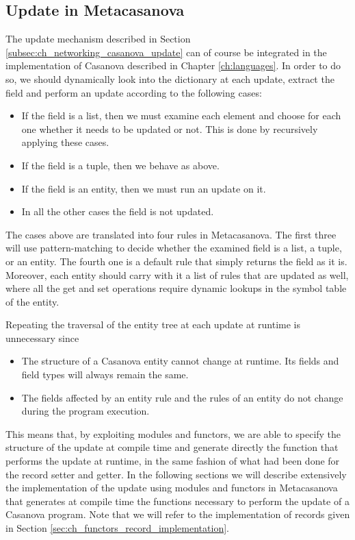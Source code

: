 \subsection{Update in Metacasanova}
\label{subsec:ch_networking_update_metacasanova}
The update mechanism described in Section \ref{subsec:ch_networking_casanova_update} can of course be integrated in the implementation of Casanova described in Chapter \ref{ch:languages}. In order to do so, we should dynamically look into the dictionary at each update, extract the field and perform an update according to the following cases:

\begin{itemize}[noitemsep]
	\item If the field is a list, then we must examine each element and choose for each one whether it needs to be updated or not. This is done by recursively applying these cases.
	\item If the field is a tuple, then we behave as above.
	\item If the field is an entity, then we must run an update on it.
	\item In all the other cases the field is not updated.
\end{itemize}

\noindent
The cases above are translated into four rules in Metacasanova. The first three will use pattern-matching to decide whether the examined field is a list, a tuple, or an entity. The fourth one is a default rule that simply returns the field as it is. Moreover, each entity should carry with it a list of rules that are updated as well, where all the get and set operations require dynamic lookups in the symbol table of the entity.

Repeating the traversal of the entity tree at each update at runtime is unnecessary since

\begin{itemize}[noitemsep]
	\item The structure of a Casanova entity cannot change at runtime. Its fields and field types will always remain the same.
	\item The fields affected by an entity rule and the rules of an entity do not change during the program execution.
\end{itemize}

\noindent
This means that, by exploiting modules and functors, we are able to specify the structure of the update at compile time and generate directly the function that performs the update at runtime, in the same fashion of what had been done for the record setter and getter. In the following sections we will describe extensively the implementation of the update using modules and functors in Metacasanova that generates at compile time the functions necessary to perform the update of a Casanova program. Note that we will refer to the implementation of records given in Section \ref{sec:ch_functors_record_implementation}.

